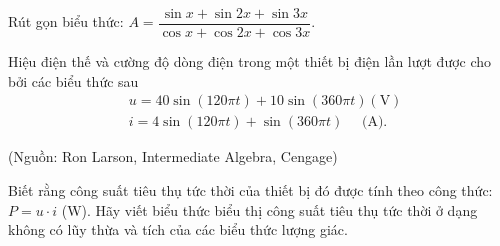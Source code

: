 \begin{bt}%
	Rút gọn biểu thức: $A=\dfrac{\sin x+\sin 2 x+\sin 3 x}{\cos x+\cos 2 x+\cos 3 x}$.
\end{bt}

\begin{bt}%
	Hiệu điện thế và cường độ dòng điện trong một thiết bị điện lần lượt được cho bởi các biểu thức sau
	$$
	\begin{aligned}
	& u=40 \sin (120 \pi t)+10 \sin (360 \pi t)(\mathrm{V}) \\
	& i=4 \sin (120 \pi t)+\sin (360 \pi t) \quad \text { (A). }
	\end{aligned}
	$$
	\begin{flushright}
		(Nguồn: Ron Larson, Intermediate Algebra, Cengage)
	\end{flushright}
	Biết rằng công suất tiêu thụ tức thời của thiết bị đó được tính theo công thức: $P=u \cdot i$ (W). Hãy viết biểu thức biểu thị công suất tiêu thụ tức thời ở dạng không có lũy thừa và tích của các biểu thức lượng giác.
\end{bt}

